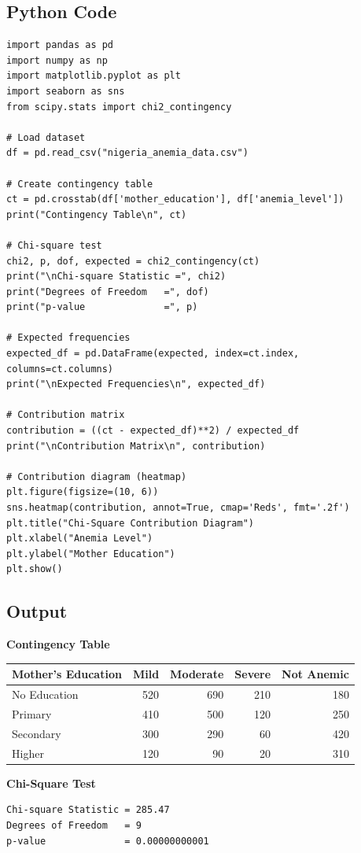 \documentclass[12pt,a4paper]{article}
\begin{document}
\subsection{Python Code}

\begin{lstlisting}
import pandas as pd
import numpy as np
import matplotlib.pyplot as plt
import seaborn as sns
from scipy.stats import chi2_contingency

# Load dataset
df = pd.read_csv("nigeria_anemia_data.csv")

# Create contingency table
ct = pd.crosstab(df['mother_education'], df['anemia_level'])
print("Contingency Table\n", ct)

# Chi-square test
chi2, p, dof, expected = chi2_contingency(ct)
print("\nChi-square Statistic =", chi2)
print("Degrees of Freedom   =", dof)
print("p-value              =", p)

# Expected frequencies
expected_df = pd.DataFrame(expected, index=ct.index, columns=ct.columns)
print("\nExpected Frequencies\n", expected_df)

# Contribution matrix
contribution = ((ct - expected_df)**2) / expected_df
print("\nContribution Matrix\n", contribution)

# Contribution diagram (heatmap)
plt.figure(figsize=(10, 6))
sns.heatmap(contribution, annot=True, cmap='Reds', fmt='.2f')
plt.title("Chi-Square Contribution Diagram")
plt.xlabel("Anemia Level")
plt.ylabel("Mother Education")
plt.show()
\end{lstlisting}

\subsection{Output}

\begin{outputbox}
\textbf{Contingency Table}
\begin{center}
\begin{tabular}{lrrrr}
\toprule
Mother's Education & Mild & Moderate & Severe & Not Anemic \\
\midrule
No Education & 520 & 690 & 210 & 180 \\
Primary      & 410 & 500 & 120 & 250 \\
Secondary    & 300 & 290 &  60 & 420 \\
Higher       & 120 &  90 &  20 & 310 \\
\bottomrule
\end{tabular}
\end{center}

\textbf{Chi-Square Test}
\begin{verbatim}
Chi-square Statistic = 285.47
Degrees of Freedom   = 9
p-value              = 0.00000000001
\end{verbatim}
\end{outputbox}
\end{document}

